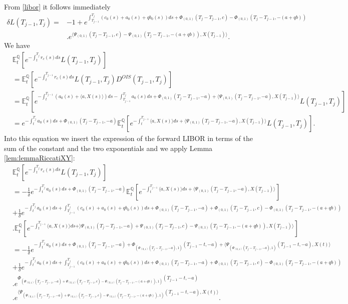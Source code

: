 \documentclass[12pt,a4paper]{article}
\theoremstyle{plain}
\numberwithin{equation}{section}
\begin{document}
From \eqref{libor} it follows immediately
\begin{align*}
\delta L(T_{j-1},T_j)=& -1+ e^{\int_{T_{j-1}}^{T_j}(c_0(s)+a_0(s)+qb_0(s))ds
+ \Phi_{(0,1)}(T_{j}-T_{j-1},c)-\Phi_{(0,1)}(T_{j}-T_{j-1},-(a+qb))}\\
& .e^{\langle \Psi_{(0,1)}(T_{j}-T_{j-1},c)-\Psi_{(0,1)}(T_{j}-T_{j-1},-(a+qb)),X(T_{j-1})\rangle}.
\end{align*}
We have
\begin{align*}
&\mathbb{E}_t^\mathbb{Q}\left[e^{-\int_{t}^{T_j}r_c(s)ds}L(T_{j-1},T_j)\right]\\
&=\mathbb{E}_t^\mathbb{Q}\left[e^{-\int_{t}^{T_{j-1}}r_c(s)ds}L(T_{j-1},T_j)D^{OIS}(T_{j-1},T_j)\right]\\
&=\mathbb{E}_t^\mathbb{Q}\left[e^{-\int_{t}^{T_{j-1}}(a_0(s)+\langle a, X(s)\rangle) ds
-\int_{T_{j-1}}^{T_{j}}a_0(s)ds+\Phi_{(0,1)}(T_{j}-T_{j-1},-a)+\langle \Psi_{(0,1)}(T_{j}-T_{j-1},-a), X(T_{j-1})\rangle }
L(T_{j-1},T_j)\right]\\
&=e^{-\int_{t}^{T_{j}}a_0(s)ds+\Phi_{(0,1)}(T_{j}-T_{j-1},-a)}
\mathbb{E}_t^\mathbb{Q}\left[e^{-\int_{t}^{T_{j-1}}\langle a, X(s)\rangle ds
+\langle \Psi_{(0,1)}(T_{j}-T_{j-1},-a), X(T_{j-1})\rangle}L(T_{j-1},T_j)\right].
\end{align*}
Into this equation we insert the expression of the forward  LIBOR in terms of the sum of the constant and the two exponentials and we apply Lemma \ref{lem:lemmaRiccatiXY}:
\begin{align*}
&\mathbb{E}_t^\mathbb{Q}\left[e^{-\int_{t}^{T_j}r_c(s)ds}L(T_{j-1},T_j)\right]\\
&=-\frac{1}{\delta}e^{-\int_{t}^{T_{j}}a_0(s)ds+\Phi_{(0,1)}(T_{j}-T_{j-1},-a)}
\mathbb{E}_t^\mathbb{Q}\left[e^{-\int_{t}^{T_{j-1}}\langle a, X(s)\rangle ds
+\langle \Psi_{(0,1)}(T_{j}-T_{j-1},-a), X(T_{j-1})\rangle}\right]\\
&+ \frac{1}{\delta}e^{-\int_{t}^{T_{j}}a_0(s)ds+\int_{T_{j-1}}^{T_j}(c_0(s)+a_0(s)+qb_0(s))ds
+\Phi_{(0,1)}(T_{j}-T_{j-1},-a)+\Phi_{(0,1)}(T_{j}-T_{j-1},c)-\Phi_{(0,1)}(T_{j}-T_{j-1},-(a+qb))}\\
&.\mathbb{E}_t^\mathbb{Q}\left[e^{-\int_{t}^{T_{j-1}}\langle a, X(s)\rangle ds
+\rangle \Psi_{(0,1)}(T_{j}-T_{j-1},-a)+ \Psi_{(0,1)}(T_{j}-T_{j-1},c)-\Psi_{(0,1)}(T_{j}-T_{j-1},-(a+qb)),X(T_{j-1})\rangle}\right]\\
&=-\frac{1}{\delta}e^{-\int_{t}^{T_{j}}a_0(s)ds+
\Phi_{(0,1)}(T_{j}-T_{j-1},-a)+
\Phi_{(\Psi_{(0,1)}(T_{j}-T_{j-1},-a),1)}(T_{j-1}-t,-a)+
\langle \Psi_{(\Psi_{(0,1)}(T_{j}-T_{j-1},-a),1)}(T_{j-1}-t,-a),X(t)\rangle}\\
&+ \frac{1}{\delta}e^{-\int_{t}^{T_{j}}a_0(s)ds+\int_{T_{j-1}}^{T_j}(c_0(s)+a_0(s)+qb_0(s))ds
+\Phi_{(0,1)}(T_{j}-T_{j-1},-a)+\Phi_{(0,1)}(T_{j}-T_{j-1},c)-\Phi_{(0,1)}(T_{j}-T_{j-1},-(a+qb))}\\
&.e^{
\Phi_{(\Psi_{(0,1)}(T_{j}-T_{j-1},-a)+ \Psi_{(0,1)}(T_{j}-T_{j-1},c)-\Psi_{(0,1)}(T_{j}-T_{j-1},-(a+qb)),1)}(T_{j-1}-t,-a)}\\
&.e^{
\langle\Psi_{(\Psi_{(0,1)}(T_{j}-T_{j-1},-a)+ \Psi_{(0,1)}(T_{j}-T_{j-1},c)-\Psi_{(0,1)}(T_{j}-T_{j-1},-(a+qb)),1)}(T_{j-1}-t,-a),X(t)\rangle}.
\end{align*}
\end{document}
